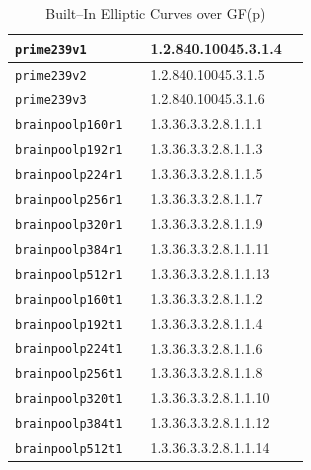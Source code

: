 \documentclass[synpaper]{book}
\begin{document}
\begin{table}[H]
\begin{center}
\begin{tabular}{|l|l|l|l|}
\hline \texttt{prime239v1}      &                                      & 1.2.840.10045.3.1.4   \\
\hline \texttt{prime239v2}      &                                      & 1.2.840.10045.3.1.5   \\
\hline \texttt{prime239v3}      &                                      & 1.2.840.10045.3.1.6   \\
\hline \texttt{brainpoolp160r1} &                                      & 1.3.36.3.3.2.8.1.1.1  \\
\hline \texttt{brainpoolp192r1} &                                      & 1.3.36.3.3.2.8.1.1.3  \\
\hline \texttt{brainpoolp224r1} &                                      & 1.3.36.3.3.2.8.1.1.5  \\
\hline \texttt{brainpoolp256r1} &                                      & 1.3.36.3.3.2.8.1.1.7  \\
\hline \texttt{brainpoolp320r1} &                                      & 1.3.36.3.3.2.8.1.1.9  \\
\hline \texttt{brainpoolp384r1} &                                      & 1.3.36.3.3.2.8.1.1.11 \\
\hline \texttt{brainpoolp512r1} &                                      & 1.3.36.3.3.2.8.1.1.13 \\
\hline \texttt{brainpoolp160t1} &                                      & 1.3.36.3.3.2.8.1.1.2  \\
\hline \texttt{brainpoolp192t1} &                                      & 1.3.36.3.3.2.8.1.1.4  \\
\hline \texttt{brainpoolp224t1} &                                      & 1.3.36.3.3.2.8.1.1.6  \\
\hline \texttt{brainpoolp256t1} &                                      & 1.3.36.3.3.2.8.1.1.8  \\
\hline \texttt{brainpoolp320t1} &                                      & 1.3.36.3.3.2.8.1.1.10 \\
\hline \texttt{brainpoolp384t1} &                                      & 1.3.36.3.3.2.8.1.1.12 \\
\hline \texttt{brainpoolp512t1} &                                      & 1.3.36.3.3.2.8.1.1.14 \\
\hline
\end{tabular}
\caption{Built--In Elliptic Curves over GF(p)}
\end{center}
\label{fig:builtincurves}
\end{table}
\end{document}

